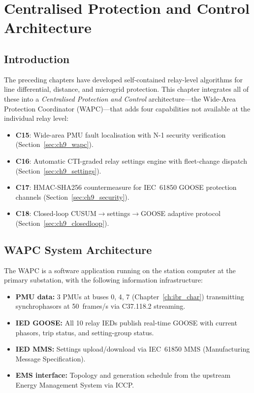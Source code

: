 \chapter{Centralised Protection and Control Architecture}
\label{ch:centralised}

\section{Introduction}
\label{sec:ch9_intro}

The preceding chapters have developed self-contained relay-level algorithms
for line differential, distance, and microgrid protection. This chapter
integrates all of these into a \emph{Centralised Protection and Control}
architecture—the Wide-Area Protection Coordinator (WAPC)—that adds
four capabilities not available at the individual relay level:
\begin{itemize}
\item \textbf{C15}: Wide-area PMU fault localisation with N-1 security
      verification (Section~\ref{sec:ch9_wapc}).
\item \textbf{C16}: Automatic CTI-graded relay settings engine with
      fleet-change dispatch (Section~\ref{sec:ch9_settings}).
\item \textbf{C17}: HMAC-SHA256 countermeasure for IEC~61850 GOOSE
      protection channels (Section~\ref{sec:ch9_security}).
\item \textbf{C18}: Closed-loop CUSUM$\to$settings$\to$GOOSE adaptive
      protocol (Section~\ref{sec:ch9_closedloop}).
\end{itemize}

\section{WAPC System Architecture}
\label{sec:ch9_wapc_arch}

The WAPC is a software application running on the station computer
at the primary substation, with the following information infrastructure:
\begin{itemize}
\item \textbf{PMU data:} 3 PMUs at buses 0, 4, 7 (Chapter~\ref{ch:ibr_char})
      transmitting synchrophasors at 50~frames/s via C37.118.2 streaming.
\item \textbf{IED GOOSE:} All 10 relay IEDs publish real-time GOOSE
      with current phasors, trip status, and setting-group status.
\item \textbf{IED MMS:} Settings upload/download via IEC~61850 MMS
      (Manufacturing Message Specification).
\item \textbf{EMS interface:} Topology and generation schedule from the
      upstream Energy Management System via ICCP.
\end{itemize}

